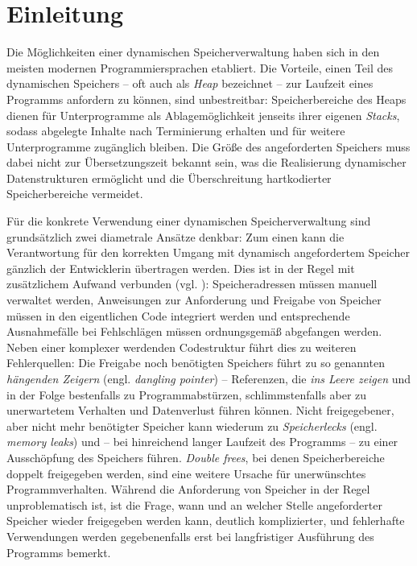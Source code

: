 \chapter{Einleitung}
\label{cha:intro}

Die Möglichkeiten einer dynamischen Speicherverwaltung haben sich in den meisten modernen Programmiersprachen etabliert.
Die Vorteile, einen Teil des dynamischen Speichers -- oft auch als \textit{Heap} bezeichnet -- zur Laufzeit eines Programms anfordern zu können, sind unbestreitbar:
Speicherbereiche des Heaps dienen für Unterprogramme als Ablagemöglichkeit jenseits ihrer eigenen \textit{Stacks}, sodass abgelegte Inhalte nach Terminierung erhalten und für weitere Unterprogramme zugänglich bleiben.
Die Größe des angeforderten Speichers muss dabei nicht zur Übersetzungszeit bekannt sein, was die Realisierung dynamischer Datenstrukturen ermöglicht und die Überschreitung hartkodierter Speicherbereiche vermeidet.

Für die konkrete Verwendung einer dynamischen Speicherverwaltung sind grundsätzlich zwei diametrale Ansätze denkbar:
Zum einen kann die Verantwortung für den korrekten Umgang mit dynamisch angefordertem Speicher gänzlich der Entwicklerin übertragen werden.
Dies ist in der Regel mit zusätzlichem Aufwand verbunden (vgl. \cite[S. 1f]{wilson1992}):
Speicheradressen müssen manuell verwaltet werden, Anweisungen zur Anforderung und Freigabe von Speicher müssen in den eigentlichen Code integriert werden und entsprechende Ausnahmefälle bei Fehlschlägen müssen ordnungsgemäß abgefangen werden.
Neben einer komplexer werdenden Codestruktur führt dies zu weiteren Fehlerquellen:
Die Freigabe noch benötigten Speichers führt zu so genannten \textit{hängenden Zeigern} (engl. \textit{dangling pointer}) -- Referenzen, die \textit{ins Leere zeigen} und in der Folge bestenfalls zu Programmabstürzen, schlimmstenfalls aber zu unerwartetem Verhalten und Datenverlust führen können.
Nicht freigegebener, aber nicht mehr benötigter Speicher kann wiederum zu \textit{Speicherlecks} (engl. \textit{memory leaks}) und -- bei hinreichend langer Laufzeit des Programms -- zu einer Ausschöpfung des Speichers führen.
\textit{Double frees}, bei denen Speicherbereiche doppelt freigegeben werden, sind eine weitere Ursache für unerwünschtes Programmverhalten.
Während die Anforderung von Speicher in der Regel unproblematisch ist, ist die Frage, wann und an welcher Stelle angeforderter Speicher wieder freigegeben werden kann, deutlich komplizierter, und fehlerhafte Verwendungen werden gegebenenfalls erst bei langfristiger Ausführung des Programms bemerkt.

